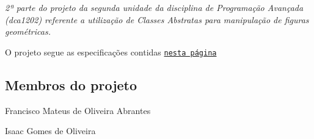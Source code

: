 {\itshape 2ª parte do projeto da segunda unidade da disciplina de Programação Avançada (dca1202) referente a utilização de Classes Abstratas para manipulação de figuras geométricas.}


\begin{DoxyItemize}
\item O projeto segue as especificações contidas \href{http://agostinhobritojr.github.io/cursos/progav/projetoscpp.html#_projeto_2_tratamento_de_classes_abstratas}{\tt nesta página}
\end{DoxyItemize}

\subsection*{Membros do projeto}


\begin{DoxyItemize}
\item Francisco Mateus de Oliveira Abrantes
\item Isaac Gomes de Oliveira 
\end{DoxyItemize}